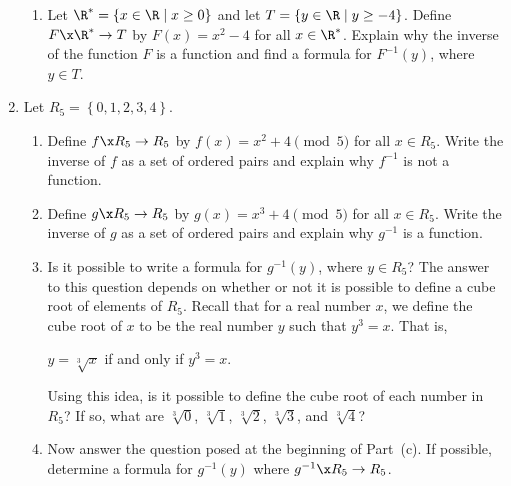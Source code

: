 \begin{enumerate}
\begin{enumerate}
\item Let $\R^* = \left\{ x \in \R \mid x \geq 0 \right\}$ and let 
$T = \left\{ y \in \R \mid y \geq -4 \right\}$. Define $F\x \R^* \to T$ by $F(x) = x^2 - 4$ for all $x \in \R^*$.  Explain why the inverse of the function $F$ is a function and find a formula for $F^{-1}(y)$, where $y \in T$.
\end{enumerate}

\item Let $R_5 = \left\{ 0, 1, 2, 3, 4 \right\}$.
\begin{enumerate}
\item Define $f\x R_5 \to R_5$ by $f(x) = x^2 + 4 \pmod 5$ for all $x \in R_5$.  Write the inverse of $f$ as a set of ordered pairs and explain why $f^{-1}$ is not a function.

\item Define $g\x R_5 \to R_5$ by $g(x) = x^3 + 4 \pmod 5$ for all $x \in R_5$.  Write the inverse of $g$ as a set of ordered pairs and explain why $g^{-1}$ is a function.

\item Is it possible to write a formula for $g^{-1}(y)$, where $y \in R_5$?  The answer to this question depends on whether or not it is possible to define a cube root of elements of $R_5$.  Recall that for a real number $x$, we define the cube root of $x$ to be the real number $y$ such that $y^3 = x$.  That is,

\begin{center}
$y = \sqrt[3]{x}$ if and only if $y^3 = x$.
\end{center}

Using this idea, is it possible to define the cube root of each number in $R_5$?  If so, what are 
$\sqrt[3]{0}$, $\sqrt[3]{1}$, $\sqrt[3]{2}$, $\sqrt[3]{3}$, and $\sqrt[3]{4}$?

\item Now answer the question posed at the beginning of Part~(c).  If possible, determine a formula for $g^{-1}(y)$ where $g^{-1}\x R_5 \to R_5$.
\end{enumerate}
\end{enumerate}



